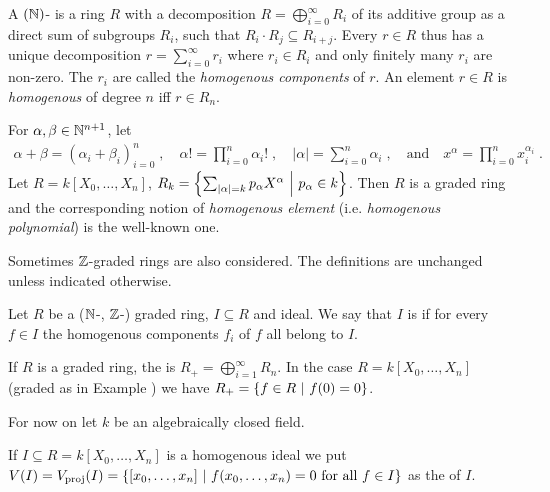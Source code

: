 \documentclass[a4paper,parskip=half,numbers=enddot, DIV=12]{scrreprt}
\begin{document}
\begin{defi}
    A $(\mathbb{N})$- is a ring $R$ with a decomposition $R = \bigoplus_{i=0}^\infty R_i$ of its additive group as a direct sum of subgroups $R_i$, such that $R_i\cdot R_j \subseteq R_{i+j}$. Every $r\in R$ thus has a unique decomposition $r=\sum_{i=0}^\infty r_i$ where $r_i\in R_i$ and only finitely many $r_i$ are non-zero.  The $r_i$ are called the \emph{homogenous components} of $r$. An element $r\in R$ is \emph{homogenous} of degree $n$ iff $r\in R_n$.
\end{defi}
\begin{example}
    For $\alpha, \beta\in \mathbb{N}^{n+1}$, let 
    \begin{align*}
        \alpha+\beta = (\alpha_i+\beta_i)_{i=0}^n\;,\quad
        \alpha! = \prod_{i=0}^n \alpha_i!\;,\quad
        |\alpha| = \sum_{i=0}^n \alpha_i\;,\quad\text{and}\quad
        x^\alpha = \prod_{i=0}^n x_i^{\alpha_i}\;. 
    \end{align*}
    Let $R=k[X_0,\ldots, X_n]$, $R_k = \left\{\sum_{|\alpha| = k} p_\alpha X^\alpha\ \middle|\  p_\alpha \in k\right\}$. Then $R$ is a graded ring and the corresponding notion of \emph{homogenous element} (i.e. \emph{homogenous polynomial}) is the well-known one.
\end{example}
\begin{rem*}
    Sometimes $\mathbb{Z}$-graded rings are also considered. The definitions are unchanged unless indicated otherwise.
\end{rem*}
\begin{defi}
    Let $R$ be a ($\mathbb{N}$-, $\mathbb{Z}$-) graded ring, $I\subseteq R$ and ideal. We say that $I$ is  if for every $f\in I$ the homogenous components $f_i$ of $f$ all belong to $I$.
\end{defi}
\begin{example}
    If $R$ is a graded ring, the  is $R_+= \bigoplus_{i=1}^\infty R_n$. In the case $R=k[X_0, \ldots, X_n]$ (graded as in Example ) we have $R_+= \left\{f\in R\ \middle|\  f(0) = 0\right\}$.
\end{example}
For now on let $k$ be an algebraically closed field.
\def\proj{{\mathrm{proj}}}
\def\aff{{\mathrm{aff}}}
\begin{defi} 
    If $I\subseteq R= k[X_0,\ldots, X_n]$ is a homogenous ideal we put $V(I) = V_\proj (I) = \left\{[x_0,\ldots, x_n]\st f(x_0,\ldots, x_n) = 0 \text{ for all } f\in I\right\}$ as the  of $I$.
\end{defi}
\end{document}
